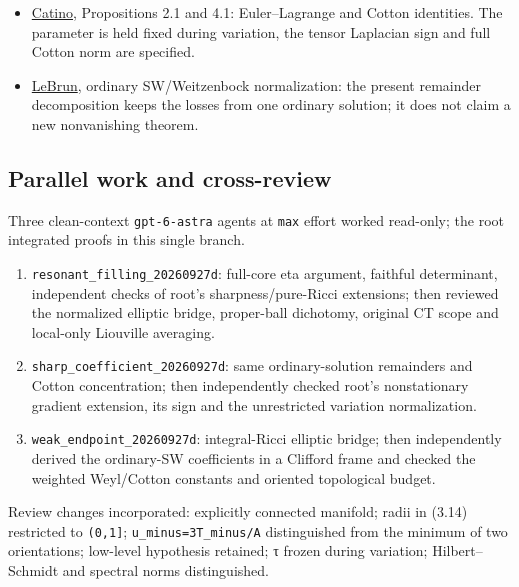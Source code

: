 \documentclass[
  10pt,
]{article}
\providecommand{\tightlist}{%
  \setlength{\itemsep}{0pt}\setlength{\parskip}{0pt}}
\begin{document}
\begin{itemize}
  bounded-Ricci extension gives covering geometry, not pointwise
  full-curvature bounds. Apply it inside the good neighborhood where
  Ricci has already been bounded. No ambient global Ricci bound is
  needed at that step.
\item
  \href{https://arxiv.org/abs/1404.0569}{Catino}, Propositions 2.1 and
  4.1: Euler--Lagrange and Cotton identities. The parameter is held
  fixed during variation, the tensor Laplacian sign and full Cotton norm
  are specified.
\item
  \href{https://arxiv.org/pdf/math/0003068}{LeBrun}, ordinary
  SW/Weitzenbock normalization: the present remainder decomposition
  keeps the losses from one ordinary solution; it does not claim a new
  nonvanishing theorem.
\end{itemize}

\hypertarget{parallel-work-and-cross-review}{%
\subsection{Parallel work and
cross-review}\label{parallel-work-and-cross-review}}

Three clean-context \texttt{gpt-6-astra} agents at \texttt{max} effort
worked read-only; the root integrated proofs in this single branch.

\begin{enumerate}
\def\labelenumi{\arabic{enumi}.}
\tightlist
\item
  \texttt{resonant\_filling\_20260927d}: full-core eta argument,
  faithful determinant, independent checks of root's
  sharpness/pure-Ricci extensions; then reviewed the normalized elliptic
  bridge, proper-ball dichotomy, original CT scope and local-only
  Liouville averaging.
\item
  \texttt{sharp\_coefficient\_20260927d}: same ordinary-solution
  remainders and Cotton concentration; then independently checked root's
  nonstationary gradient extension, its sign and the unrestricted
  variation normalization.
\item
  \texttt{weak\_endpoint\_20260927d}: integral-Ricci elliptic bridge;
  then independently derived the ordinary-SW coefficients in a Clifford
  frame and checked the weighted Weyl/Cotton constants and oriented
  topological budget.
\end{enumerate}

Review changes incorporated: explicitly connected manifold; radii in
(3.14) restricted to \texttt{(0,1{]}}; \texttt{u\_minus=3T\_minus/A}
distinguished from the minimum of two orientations; low-level hypothesis
retained; τ frozen during variation; Hilbert--Schmidt and spectral norms
distinguished.
\end{document}
